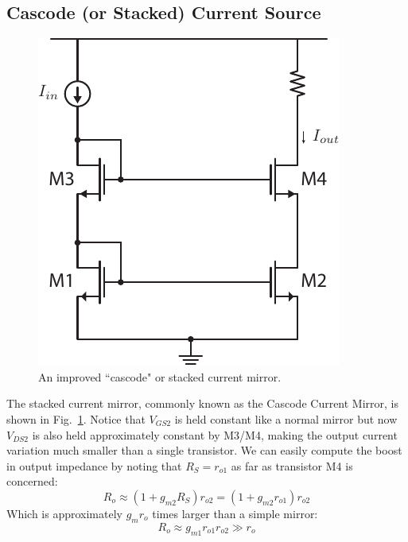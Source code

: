 \subsection{Cascode (or Stacked) Current Source}
\begin{figure}[tb]
\centering
\includegraphics[scale=1]{12mirror_cascode.pdf}
\caption{An improved ``cascode" or stacked current mirror.}
\label{fig:12mirror_cascode.pdf}
\end{figure}
The stacked current mirror, commonly known as the Cascode Current Mirror, is shown in Fig.~\ref{fig:12mirror_cascode.pdf}.  Notice that $V_{GS2}$ is held constant like a normal mirror but now $V_{DS2}$ is also held  approximately constant by M3/M4, making the output current variation much smaller than a single transistor. 
We can easily compute the boost in output impedance by noting that $R_S = r_{o1}$ as far as transistor M4 is concerned: 
    \begin{equation}
        {R_o} \approx \left( {1 + {g_{m2}}{R_S}} \right){r_{o2}} = \left( {1 + {g_{m2}}{r_{o1}}} \right){r_{o2}}
    \end{equation}
Which is approximately $g_m r_o$ times larger than a simple mirror:
    \begin{equation}
        {R_o} \approx {g_{m1}}r_{o1} r_{o2} \gg {r_o}
    \end{equation}
